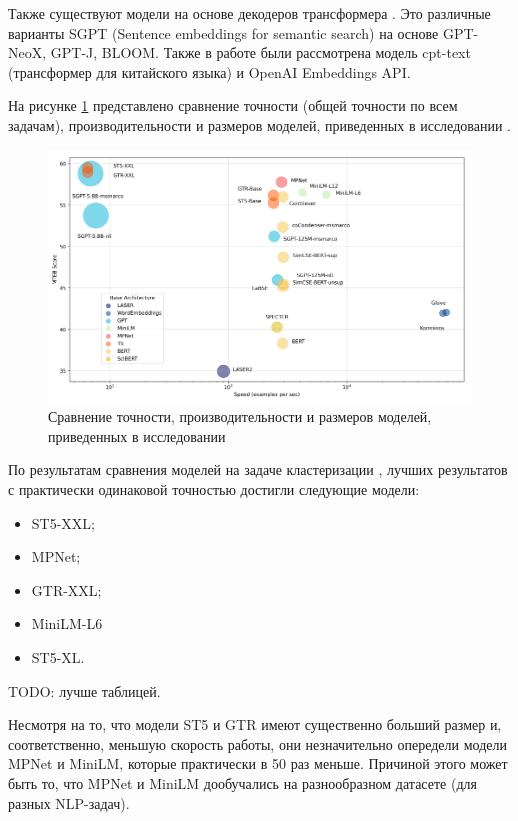 Также существуют модели на основе декодеров трансформера \cite{mteb}. Это различные варианты SGPT (Sentence embeddings for semantic search) на основе GPT-NeoX, GPT-J, BLOOM. Также в работе были рассмотрена модель cpt-text (трансформер для китайского языка) и OpenAI Embeddings API.

На рисунке \ref{img:mteb_models} представлено сравнение точности (общей точности по всем задачам), производительности и размеров моделей, приведенных в исследовании \cite{mteb}.

\begin{figure}[h]
    \centering
    \includegraphics[width=\linewidth]{images/mteb-models.png}
    \caption{Сравнение точности, производительности и размеров моделей, приведенных в исследовании \cite{mteb}}
    \label{img:mteb_models}
\end{figure}

По результатам сравнения моделей на задаче кластеризации \cite{mteb}, лучших результатов с практически одинаковой точностью достигли следующие модели:
\begin{itemize}
    \item ST5-XXL;
    \item MPNet;
    \item GTR-XXL;
    \item MiniLM-L6
    \item ST5-XL.
\end{itemize}
TODO: лучше таблицей.

Несмотря на то, что модели ST5 и GTR имеют существенно больший размер и, соответственно, меньшую скорость работы, они незначительно опередели модели MPNet и MiniLM, которые практически в 50 раз меньше. Причиной этого может быть то, что MPNet и MiniLM дообучались на разнообразном датасете (для разных NLP-задач).

